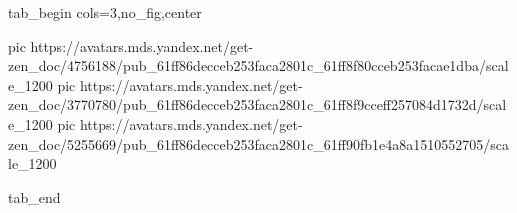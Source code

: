 
 
 
 
 


\ifcmt
  tab_begin cols=3,no_fig,center

     pic https://avatars.mds.yandex.net/get-zen_doc/4756188/pub_61ff86decceb253faca2801c_61ff8f80cceb253facae1dba/scale_1200
     pic https://avatars.mds.yandex.net/get-zen_doc/3770780/pub_61ff86decceb253faca2801c_61ff8f9cceff257084d1732d/scale_1200
     pic https://avatars.mds.yandex.net/get-zen_doc/5255669/pub_61ff86decceb253faca2801c_61ff90fb1e4a8a1510552705/scale_1200

  tab_end
\fi
